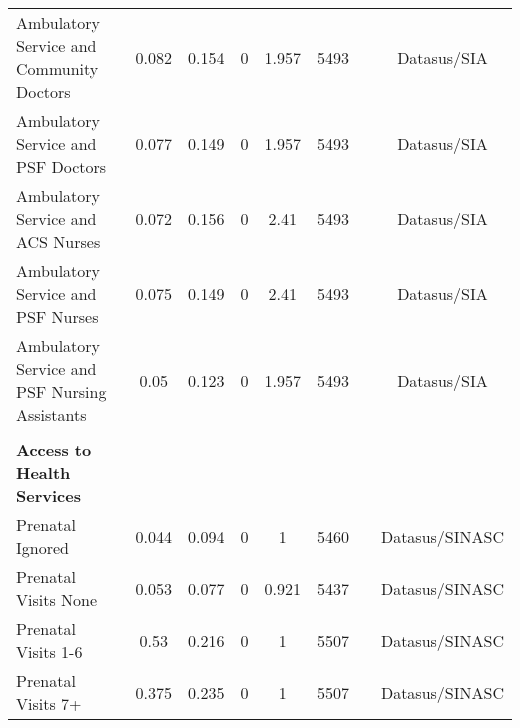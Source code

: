 \begin{table}[H]
\begin{footnotesize}
\begin{center}
{\begin{threeparttable}[b]
\begin{tabular}{rrrrrrrr}
    \multicolumn{1}{l}{Ambulatory Service and Community Doctors} & \multicolumn{1}{c}{0.082} & \multicolumn{1}{c}{0.154} & \multicolumn{1}{c}{0} & \multicolumn{1}{c}{1.957} & \multicolumn{1}{c}{5493} &       & \multicolumn{1}{c}{Datasus/SIA} \\
    \multicolumn{1}{l}{Ambulatory Service and PSF Doctors} & \multicolumn{1}{c}{0.077} & \multicolumn{1}{c}{0.149} & \multicolumn{1}{c}{0} & \multicolumn{1}{c}{1.957} & \multicolumn{1}{c}{5493} &       & \multicolumn{1}{c}{Datasus/SIA} \\
    \multicolumn{1}{l}{Ambulatory Service and ACS Nurses} & \multicolumn{1}{c}{0.072} & \multicolumn{1}{c}{0.156} & \multicolumn{1}{c}{0} & \multicolumn{1}{c}{2.41} & \multicolumn{1}{c}{5493} &       & \multicolumn{1}{c}{Datasus/SIA} \\
    \multicolumn{1}{l}{Ambulatory Service and PSF Nurses} & \multicolumn{1}{c}{0.075} & \multicolumn{1}{c}{0.149} & \multicolumn{1}{c}{0} & \multicolumn{1}{c}{2.41} & \multicolumn{1}{c}{5493} &       & \multicolumn{1}{c}{Datasus/SIA} \\
    \multicolumn{1}{l}{Ambulatory Service and PSF Nursing Assistants} & \multicolumn{1}{c}{0.05} & \multicolumn{1}{c}{0.123} & \multicolumn{1}{c}{0} & \multicolumn{1}{c}{1.957} & \multicolumn{1}{c}{5493} &       & \multicolumn{1}{c}{Datasus/SIA} \\
          &       &       &       &       &       &       &  \\
    \multicolumn{1}{l}{\textbf{Access to Health Services}} &       &       &       &       &       &       &  \\
    \multicolumn{1}{l}{Prenatal Ignored} & \multicolumn{1}{c}{0.044} & \multicolumn{1}{c}{0.094} & \multicolumn{1}{c}{0} & \multicolumn{1}{c}{1} & \multicolumn{1}{c}{5460} &       &  \multicolumn{1}{c}{Datasus/SINASC}\\
    \multicolumn{1}{l}{Prenatal Visits None} & \multicolumn{1}{c}{0.053} & \multicolumn{1}{c}{0.077} & \multicolumn{1}{c}{0} & \multicolumn{1}{c}{0.921} & \multicolumn{1}{c}{5437} &       & \multicolumn{1}{c}{Datasus/SINASC} \\
    \multicolumn{1}{l}{Prenatal Visits 1-6} & \multicolumn{1}{c}{0.53} & \multicolumn{1}{c}{0.216} & \multicolumn{1}{c}{0} & \multicolumn{1}{c}{1} & \multicolumn{1}{c}{5507} &       & \multicolumn{1}{c}{Datasus/SINASC} \\
    \multicolumn{1}{l}{Prenatal Visits 7+} & \multicolumn{1}{c}{0.375} & \multicolumn{1}{c}{0.235} & \multicolumn{1}{c}{0} & \multicolumn{1}{c}{1} & \multicolumn{1}{c}{5507} &       & \multicolumn{1}{c}{Datasus/SINASC} \\

\end{tabular}
\end{threeparttable}}
\end{center}
\end{footnotesize}
\end{table}
